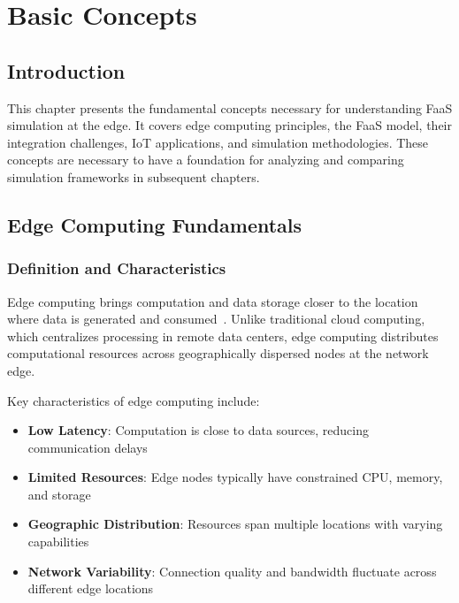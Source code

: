 \chapter{Basic Concepts}

\section{Introduction}

This chapter presents the fundamental concepts necessary for understanding FaaS simulation at the edge. It covers edge computing principles, the FaaS model, their integration challenges, IoT applications, and simulation methodologies. These concepts are necessary to have a foundation for analyzing and comparing simulation frameworks in subsequent chapters.

\section{Edge Computing Fundamentals}

\subsection{Definition and Characteristics}

Edge computing brings computation and data storage closer to the location where data is generated and consumed~\cite{aslanpour2021serverless}. Unlike traditional cloud computing, which centralizes processing in remote data centers, edge computing distributes computational resources across geographically dispersed nodes at the network edge.

Key characteristics of edge computing include:
\begin{itemize}
    \item \textbf{Low Latency}: Computation is close to data sources, reducing communication delays
    \item \textbf{Limited Resources}: Edge nodes typically have constrained CPU, memory, and storage
    \item \textbf{Geographic Distribution}: Resources span multiple locations with varying capabilities
    \item \textbf{Network Variability}: Connection quality and bandwidth fluctuate across different edge locations
\end{itemize}

